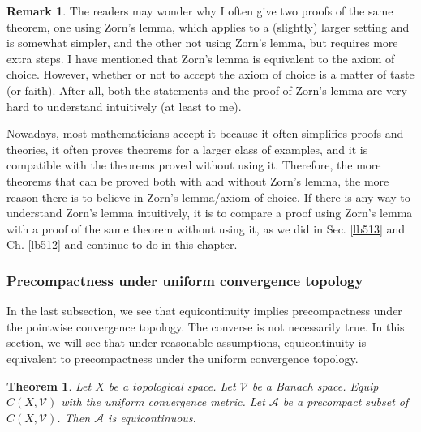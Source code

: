 \documentclass[12pt,b5paper,notitlepage]{article}
\theoremstyle{definition}
\newtheorem{rem}[df]{Remark}
\theoremstyle{plain}
\newtheorem{thm}[df]{Theorem}
\newcommand{\mc}{\mathcal}
\newcommand{\scr}{\mathscr}
\numberwithin{equation}{section}
\begin{document}
\begin{rem}
The readers may wonder why I often give two proofs of the same theorem, one using Zorn's lemma, which applies to a (slightly) larger setting and is somewhat simpler, and the other not using Zorn's lemma, but requires more extra steps. I have mentioned that Zorn's lemma is equivalent to the axiom of choice. However, whether or not to accept the axiom of choice is a matter of taste (or faith). After all, both the statements and the proof of Zorn's lemma are very hard to understand intuitively (at least to me).  

Nowadays, most mathematicians accept it because it often simplifies proofs and theories, it often proves theorems for a larger class of examples, and it is compatible with the theorems proved without using it. Therefore, the more theorems that can be proved both with and without Zorn's lemma, the more reason there is to believe in Zorn's lemma/axiom of choice. If there is any way to understand Zorn's lemma intuitively, it is to compare a proof using Zorn's lemma with a proof of the same theorem without using it, as we did in Sec. \ref{lb513} and Ch. \ref{lb512} and continue to do in this chapter.   \hfill\qedsymbol
\end{rem}


\subsubsection{Precompactness under uniform convergence topology}

In the last subsection, we see that equicontinuity implies precompactness under the pointwise convergence topology. The converse is not necessarily true. In this section, we will see that under reasonable assumptions, equicontinuity is equivalent to precompactness under the uniform convergence topology.


\begin{thm}\label{lb515}
Let $X$ be a topological space. Let $\mc V$ be a Banach space. Equip $C(X,\mc V)$ with the uniform convergence metric. Let $\scr A$ be a precompact subset of $C(X,\mc V)$. Then $\scr A$ is equicontinuous.
\end{thm}
\end{document}
